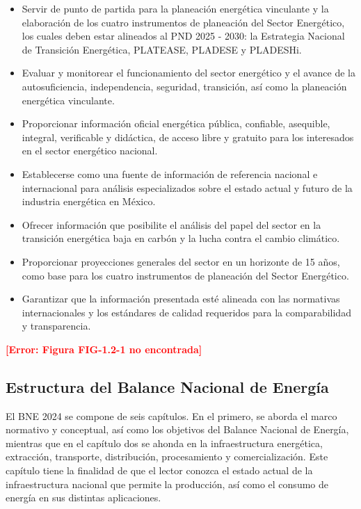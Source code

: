 \documentclass{sener2025}
\begin{document}
\begin{itemize}
  \item Servir de punto de partida para la planeación energética vinculante y la elaboración de los cuatro instrumentos de planeación del Sector Energético, los cuales deben estar alineados al PND 2025 - 2030: la Estrategia Nacional de Transición Energética, PLATEASE, PLADESE y PLADESHi.
  \item Evaluar y monitorear el funcionamiento del sector energético y el avance de la autosuficiencia, independencia, seguridad, transición, así como la planeación energética vinculante.
  \item Proporcionar información oficial energética pública, confiable, asequible, integral, verificable y didáctica, de acceso libre y gratuito para los interesados en el sector energético nacional.
  \item Establecerse como una fuente de información de referencia nacional e internacional para análisis especializados sobre el estado actual y futuro de la industria energética en México.
  \item Ofrecer información que posibilite el análisis del papel del sector en la transición energética baja en carbón y la lucha contra el cambio climático.
  \item Proporcionar proyecciones generales del sector en un horizonte de 15 años, como base para los cuatro instrumentos de planeación del Sector Energético.
  \item Garantizar que la información presentada esté alineada con las normativas internacionales y los estándares de calidad requeridos para la comparabilidad y transparencia.
\end{itemize}
\textbf{\textcolor{red}{[Error: Figura FIG-1.2-1 no encontrada]}}


\subsection{ Estructura del Balance Nacional de Energía}

El BNE 2024 se compone de seis capítulos. En el primero, se aborda el marco normativo y conceptual, así como los objetivos del Balance Nacional de Energía, mientras que en el capítulo dos se ahonda en la infraestructura energética, extracción, transporte, distribución, procesamiento y comercialización. Este capítulo tiene la finalidad de que el lector conozca el estado actual de la infraestructura nacional que permite la producción, así como el consumo de energía en sus distintas aplicaciones.
\end{document}
